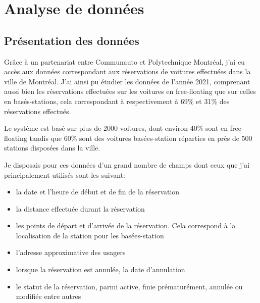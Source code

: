\documentclass[12pt,a4paper]{article}
\newcommand{\1}[1]{\mathbbm{1}_{\{#1\}} }
\theoremstyle{definition}
\begin{document}
\section{Analyse de données}
\subsection{Présentation des données}

Grâce à un partenariat entre Communauto et Polytechnique Montréal, j'ai eu accès aux données correspondant aux réservations de voitures effectuées dans la ville de Montréal. 
J'ai ainsi pu étudier les données de l'année 2021, comprenant  aussi bien les réservations effectuées sur les voitures en free-floating que sur celles en basés-stations, cela correspondant à respectivement à 69\% et 31\% des réservations effectués.


Le système est basé sur plus de 2000 voitures, dont environ 40\% sont en free-floating tandis que 60\% sont des voitures basées-station réparties en près de 500 stations disposées dans la ville.

Je disposais pour ces données d'un grand nombre de champs dont ceux que j'ai principalement utilisés sont les suivant:
\begin{itemize}
\item la date et l'heure de début et de fin de la réservation
\item la distance effectuée durant la réservation
\item les points de départ et d'arrivée de la réservation. Cela correspond à la localisation de la station pour les basées-station
\item l'adresse approximative des usagers
\item lorsque la réservation est annulée, la date d'annulation
\item le statut de la réservation, parmi active, finie prématurément, annulée ou modifiée entre autres
\end{itemize}
\end{document}
